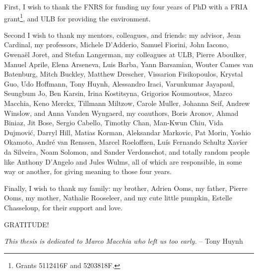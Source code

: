 
\ifdraft\else%
First, I wish to thank the FNRS for funding my four years of PhD with a FRIA
grant\footnote{%
Grants 5112416F and 5203818F.%
}, and ULB for providing the environment.

Second I wish to thank my mentors, colleagues, and friends:
%
my advisor,
Jean Cardinal,
%
my professors,
Michele D'Adderio,
Samuel Fiorini,
John Iacono,
Gwenaël Joret,
and
Stefan Langerman,
%
my colleagues at ULB,
Pierre Aboulker,
Manuel Aprile,
Elena Arseneva,
Luis Barba,
Yann Barsamian,
Wouter Cames van Batenburg,
Mitch Buckley,
Matthew Drescher,
Vissarion Fisikopoulos,
Krystal Guo,
Udo Hoffmann,
Tony Huynh,
Alessandro Iraci,
Varunkumar Jayapaul,
Seungbum Jo,
Ben Karsin,
Irina Kostitsyna,
Grigorios Koumoutsos,
Marco Macchia,
Keno Merckx,
Tillmann Miltzow,
Carole Muller,
Johanna Seif,
Andrew Winslow,
and
Anna Vanden Wyngaerd,
%
my coauthors,
Boris Aronov,
Ahmad Biniaz,
Jit Bose,
Sergio Cabello,
Timothy Chan,
Man-Kwun Chiu,
Vida Dujmovi\'c,
Darryl Hill,
Matias Korman,
Aleksandar Markovic,
Pat Morin,
Yoshio Okamoto,
André van Renssen,
Marcel Roeloffzen,
Luís Fernando Schultz Xavier da Silveira,
Noam Solomon,
and
Sander Verdonschot,
%
and
%
totally random people like
Anthony D'Angelo
and
Jules Wulms,
all of which are responsible, in some way or another, for giving meaning to
those four years.

Finally, I wish to thank my family:
my brother, Adrien Ooms,
my father, Pierre Ooms,
my mother, Nathalie Rooseleer,
%
and
%
my cute little pumpkin, Estelle Chasseloup,
for their support and love.

\vspace{\fill}
\centerline{\LARGE GRATITUDE!}
\vspace{\fill}
\centerline{\emph{This thesis is dedicated to Marco Macchia who left us too
early.} -- Tony Huynh}
\vspace{\fill}
\fi
